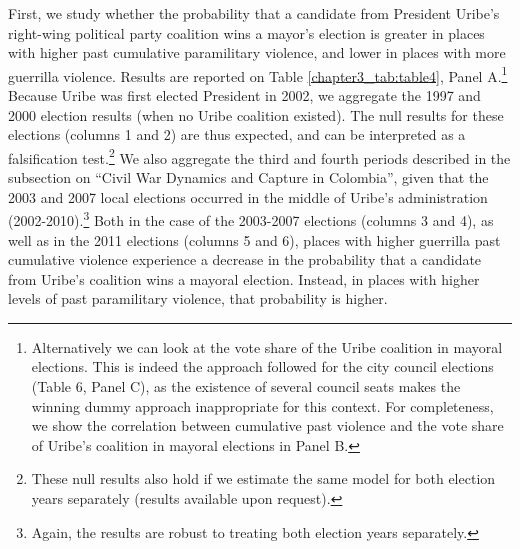 First, we study whether the probability that a candidate from President Uribe's right-wing political party coalition wins a mayor's election is greater in places with higher past cumulative paramilitary violence, and lower in places with more guerrilla violence. Results are reported on Table \ref{chapter3_tab:table4}, Panel A.\footnote{Alternatively we can look at the vote share of the Uribe coalition in mayoral elections. This is indeed the approach followed for the city council elections (Table 6, Panel C), as the existence of several council seats makes the winning dummy approach inappropriate for this context. For completeness, we show the correlation between cumulative past violence and the vote share of Uribe's coalition in mayoral elections in Panel B.} Because Uribe was first elected President in 2002, we aggregate the 1997 and 2000 election results (when no Uribe coalition existed). The null results for these elections (columns 1 and 2) are thus expected, and can be interpreted as a falsification test.\footnote{These null results also hold if we estimate the same model for both election years separately (results available upon request).} We also aggregate the third and fourth periods described in the subsection on ``Civil War Dynamics and Capture in Colombia'', given that the 2003 and 2007 local elections occurred in the middle of Uribe's administration (2002-2010).\footnote{Again, the results are robust to treating both election years separately.} Both in the case of the 2003-2007 elections (columns 3 and 4), as well as in the 2011 elections (columns 5 and 6), places with higher guerrilla past cumulative violence experience a decrease in the probability that a candidate from Uribe's coalition wins a mayoral election. Instead, in places with higher levels of past paramilitary violence, that probability is higher.



